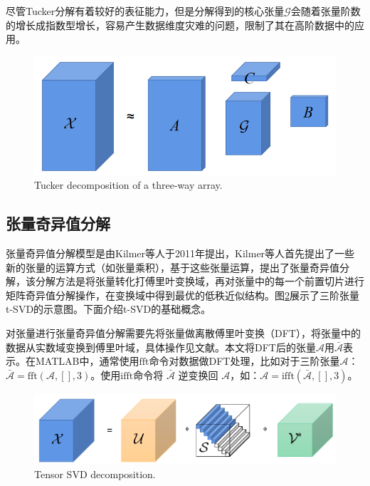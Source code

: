 尽管Tucker分解有着较好的表征能力，但是分解得到的核心张量$ \mathcal{G} $会随着张量阶数的增长成指数型增长，容易产生数据维度灾难的问题，限制了其在高阶数据中的应用。

\begin{figure}[htbp]
	\centering
	\includegraphics[scale=0.5]{pic/chap2/6.png}
	{Tucker decomposition of a three-way array.}
	\label{figure_tucker}
\end{figure}

\subsection{张量奇异值分解}
张量奇异值分解模型是由Kilmer等人\cite{18}于2011年提出，Kilmer等人首先提出了一些新的张量的运算方式（如张量乘积），基于这些张量运算，提出了张量奇异值分解，该分解方法是将张量转化打傅里叶变换域，再对张量中的每一个前置切片进行矩阵奇异值分解操作，在变换域中得到最优的低秩近似结构。图\ref{figure:tsvd}展示了三阶张量t-SVD的示意图。下面介绍t-SVD的基础概念。

对张量进行张量奇异值分解需要先将张量做离散傅里叶变换（DFT），将张量中的数据从实数域变换到傅里叶域，具体操作见文献\cite{18}。本文将DFT后的张量$ \mathcal{A} $用$  \bar{\mathcal{A}}  $表示。在MATLAB中，通常使用$ \mathrm{fft} $命令对数据做DFT处理，比如对于三阶张量$ \mathcal{A} $：$ 	\mathcal{\bar A}=\mathrm{fft}(\mathcal{A},[], 3)$。使用$ \mathrm{ifft} $命令将 $ \bar{\mathcal{A}} $ 逆变换回 $ \mathcal{A} $，如：$ \mathcal{A}=\mathrm{ifft}(\bar{\mathcal{A}},[], 3) $。

\begin{figure}[htbp]
	\centering
	\includegraphics[scale=0.5]{pic/chap2/7.png}
	{Tensor SVD decomposition.}
	\label{figure:tsvd}
\end{figure}

